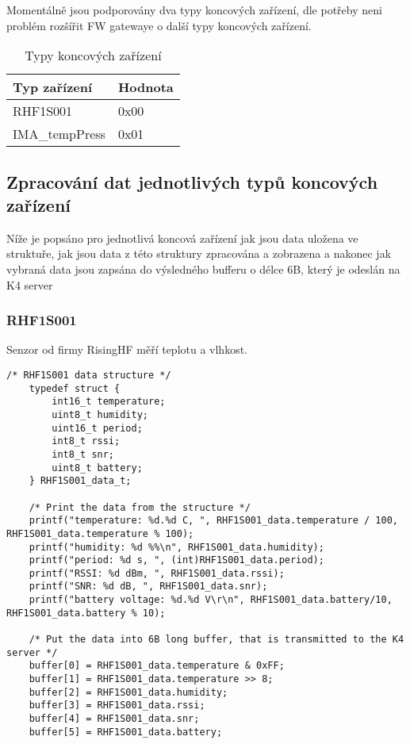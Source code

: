 Momentálně jsou podporovány dva typy koncových zařízení, dle potřeby neni problém rozšířit FW gatewaye o další typy koncových zařízení.

\begin{table}[!h]
    \centering
    \begin{tabular}{ |l|l| }
     \hline

     Typ zařízení       & Hodnota         \\ \hline \hline
     RHF1S001           & 0x00            \\ \hline
     IMA\_tempPress     & 0x01            \\ \hline
     
    \end{tabular}
    \caption{Typy koncových zařízení}
    \label{table:TypyKoncZarizeni}
\end{table}

\subsection{Zpracování dat jednotlivých typů koncových zařízení}
Níže je popsáno pro jednotlivá koncová zařízení jak jsou data uložena ve struktuře, jak jsou data z této struktury zpracována a zobrazena a nakonec jak vybraná data jsou zapsána do výsledného bufferu o délce 6B, který je odeslán na K4 server

\subsubsection{RHF1S001}
Senzor od firmy RisingHF měří teplotu a vlhkost.

\begin{lstlisting}[style=CStyle]
    /* RHF1S001 data structure */   
    typedef struct {
        int16_t temperature;
        uint8_t humidity;
        uint16_t period;
        int8_t rssi;
        int8_t snr;
        uint8_t battery;
    } RHF1S001_data_t;

    /* Print the data from the structure */
	printf("temperature: %d.%d C, ", RHF1S001_data.temperature / 100, RHF1S001_data.temperature % 100);
	printf("humidity: %d %%\n", RHF1S001_data.humidity);
	printf("period: %d s, ", (int)RHF1S001_data.period);
	printf("RSSI: %d dBm, ", RHF1S001_data.rssi);
	printf("SNR: %d dB, ", RHF1S001_data.snr);
	printf("battery voltage: %d.%d V\r\n", RHF1S001_data.battery/10, RHF1S001_data.battery % 10);

    /* Put the data into 6B long buffer, that is transmitted to the K4 server */
	buffer[0] = RHF1S001_data.temperature & 0xFF;
	buffer[1] = RHF1S001_data.temperature >> 8;
	buffer[2] = RHF1S001_data.humidity;
	buffer[3] = RHF1S001_data.rssi;
	buffer[4] = RHF1S001_data.snr;
	buffer[5] = RHF1S001_data.battery;
\end{lstlisting}


